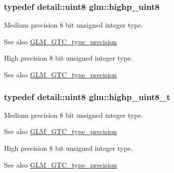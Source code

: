 \subsubsection[{\texorpdfstring{highp\+\_\+uint8}{highp_uint8}}]{\setlength{\rightskip}{0pt plus 5cm}typedef detail\+::uint8 {\bf glm\+::highp\+\_\+uint8}}\hypertarget{group__gtc__type__precision_ga2c27c6dd26e893786f04b10f99c1ee95}{}\label{group__gtc__type__precision_ga2c27c6dd26e893786f04b10f99c1ee95}
Medium precision 8 bit unsigned integer type. \begin{DoxySeeAlso}{See also}
\hyperlink{group__gtc__type__precision}{G\+L\+M\+\_\+\+G\+T\+C\+\_\+type\+\_\+precision}
\end{DoxySeeAlso}
High precision 8 bit unsigned integer type. \begin{DoxySeeAlso}{See also}
\hyperlink{group__gtc__type__precision}{G\+L\+M\+\_\+\+G\+T\+C\+\_\+type\+\_\+precision} 
\end{DoxySeeAlso}
\subsubsection[{\texorpdfstring{highp\+\_\+uint8\+\_\+t}{highp_uint8_t}}]{\setlength{\rightskip}{0pt plus 5cm}typedef detail\+::uint8 {\bf glm\+::highp\+\_\+uint8\+\_\+t}}\hypertarget{group__gtc__type__precision_ga9ba529fcc75b82d23da979f0ce6e4518}{}\label{group__gtc__type__precision_ga9ba529fcc75b82d23da979f0ce6e4518}
Medium precision 8 bit unsigned integer type. \begin{DoxySeeAlso}{See also}
\hyperlink{group__gtc__type__precision}{G\+L\+M\+\_\+\+G\+T\+C\+\_\+type\+\_\+precision}
\end{DoxySeeAlso}
High precision 8 bit unsigned integer type. \begin{DoxySeeAlso}{See also}
\hyperlink{group__gtc__type__precision}{G\+L\+M\+\_\+\+G\+T\+C\+\_\+type\+\_\+precision} 
\end{DoxySeeAlso}
